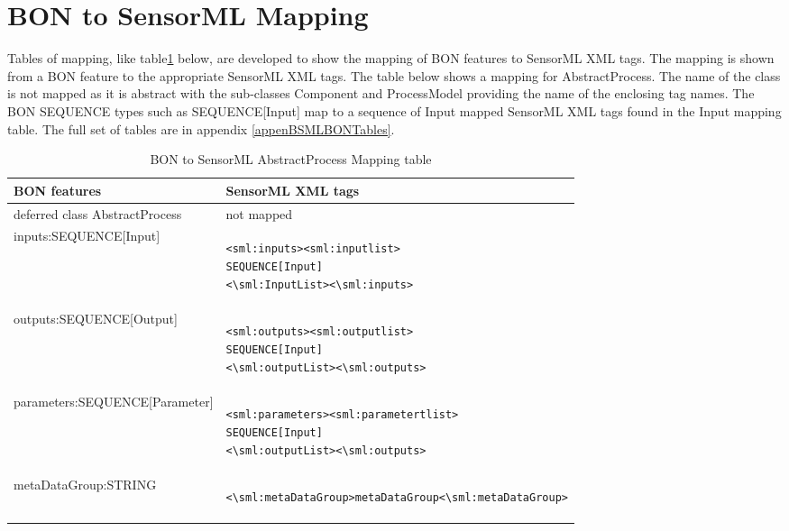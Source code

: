 \documentclass[]{final_report}
\begin{document}
\section{BON to SensorML Mapping}
Tables of mapping, like table\ref{tab:bonsmlexample} below, are developed to show the mapping of BON features to SensorML XML tags. The mapping is shown from a BON feature to the appropriate SensorML XML tags. The table below shows a mapping for AbstractProcess. The name of the class is not mapped as it is abstract with the sub-classes Component and ProcessModel providing the name of the enclosing tag names. The  BON SEQUENCE types such as SEQUENCE[Input] map to a sequence of Input mapped SensorML XML tags found in the Input mapping table. The full set of tables are in appendix \ref{appenBSMLBONTables}.

\lstset{frame=none}

\begin{table}[!th]

\centering
\begin{tabular}{|l|l|}
\hline
BON features & SensorML XML tags\\
\hline
   deferred class AbstractProcess  & not mapped\\
\hline     
     inputs:SEQUENCE[Input] & \begin{lstlisting}
<sml:inputs><sml:inputlist>
SEQUENCE[Input]
<\sml:InputList><\sml:inputs>\end{lstlisting}\\

\hline 
     outputs:SEQUENCE[Output] & \begin{lstlisting}
<sml:outputs><sml:outputlist>
SEQUENCE[Input]
<\sml:outputList><\sml:outputs>\end{lstlisting}\\
\hline
     parameters:SEQUENCE[Parameter] & \begin{lstlisting}
<sml:parameters><sml:parametertlist>
SEQUENCE[Input]
<\sml:outputList><\sml:outputs>\end{lstlisting}\\

\hline                 
     metaDataGroup:STRING &  \begin{lstlisting}
<\sml:metaDataGroup>metaDataGroup<\sml:metaDataGroup>\end{lstlisting}\\
 \hline    

\end{tabular}

\caption{BON to SensorML AbstractProcess Mapping table}
\label{tab:bonsmlexample}
\end{table}
\end{document}
